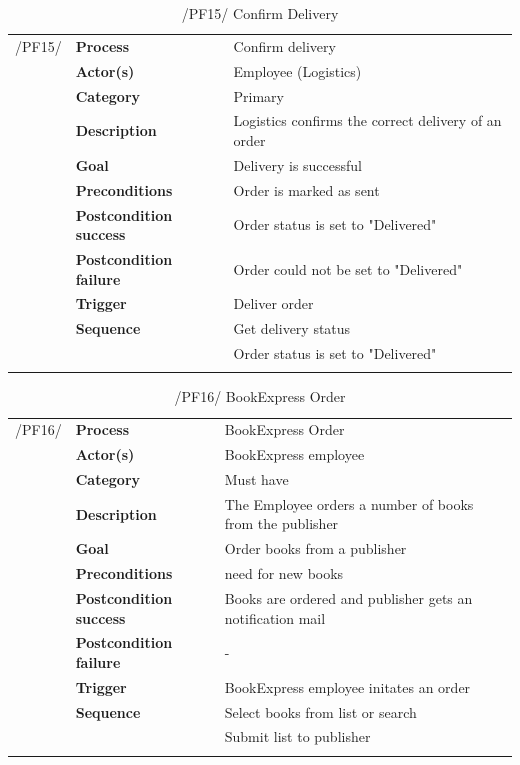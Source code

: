 \documentclass[11pt,a4paper,oneside,svgnames]{report}
\begin{document}
\begin{table}[H]
\centering
\begin{tabular}{p{1.5cm}p{3cm}p{8cm}}
\cellcolor{white}/PF15/	& \textbf{Process} & Confirm delivery\\
\cellcolor{white}		& \textbf{Actor(s)} & Employee (Logistics)\\
\cellcolor{white}		& \textbf{Category} & Primary\\
\cellcolor{white}		& \textbf{Description}	 & Logistics confirms the correct delivery of an order\\
\cellcolor{white}		& \textbf{Goal} & Delivery is successful\\
\cellcolor{white}		& \textbf{Preconditions} & Order is marked as sent\\
\cellcolor{white}		& \textbf{Postcondition success} & Order status is set to "Delivered"\\
\cellcolor{white}		& \textbf{Postcondition failure} & Order could not be set to "Delivered"\\
\cellcolor{white}		& \textbf{Trigger} & Deliver order\\
\cellcolor{white}		& \textbf{Sequence} & Get delivery status\\
\cellcolor{white}		& & Order status is set to "Delivered"\\
\cellcolor{white}\hfill \\
\end{tabular}
\caption{/PF15/ Confirm Delivery}
\label{tab:pf15}
\end{table}

\begin{table}[H]
\centering
\begin{tabular}{p{1.5cm}p{3cm}p{8cm}}
\cellcolor{white}/PF16/	& \textbf{Process} & BookExpress Order\\
\cellcolor{white}		& \textbf{Actor(s)} & BookExpress employee\\
\cellcolor{white}		& \textbf{Category} & Must have\\
\cellcolor{white}		& \textbf{Description}	 & The Employee orders a number of books from the publisher\\
\cellcolor{white}		& \textbf{Goal} & Order books from a publisher\\
\cellcolor{white}		& \textbf{Preconditions} & need for new books\\
\cellcolor{white}		& \textbf{Postcondition success} & Books are ordered and publisher gets an notification mail\\
\cellcolor{white}		& \textbf{Postcondition failure} & -\\
\cellcolor{white}		& \textbf{Trigger} & BookExpress employee initates an order\\
\cellcolor{white}		& \textbf{Sequence} & Select books from list or search\\
\cellcolor{white}		& & Submit list to publisher\\
\cellcolor{white}\hfill \\
\end{tabular}
\caption{/PF16/ BookExpress Order}
\label{tab:pf16}
\end{table}
\end{document}

